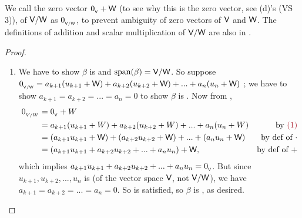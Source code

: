 \begin{note}
We call the zero vector \(0_{_{\textsf{V}}} + \textsf{W}\) (to see why this is the zero vector, see (d)'s (VS 3)), of \(\textsf{V}/\textsf{W}\) as \(0_{_{\textsf{V}/\textsf{W}}}\), to prevent ambiguity of zero vectors of \(\textsf{V}\) and \(\textsf{W}\).
The definitions of addition and scalar multiplication of \(\textsf{V}/\textsf{W}\) are also in .
\end{note}

\begin{proof} \ 

\begin{enumerate}
\item
We have to show \(\beta\) is \LID{} and \(\operatorname{span}(\beta) = \textsf{V}/\textsf{W}\).
So suppose \(0_{_{\textsf{V}/\textsf{W}}} = a_{k + 1} (u_{k + 1} + \textsf{W}) + a_{k + 2} (u_{k + 2} + \textsf{W}) + ... + a_n (u_n + \textsf{W})\) ;
we have to show \(a_{k + 1} = a_{k + 2} = ... = a_n = 0\) to show \(\beta\) is \LID{} .
Now from ,
\begin{align*}
    0_{_{V/W}} & = \OV + W \\
               & = a_{k + 1} (u_{k + 1} + W) + a_{k + 2} (u_{k + 2} + W) + ... + a_n (u_n + W) & \text{by \MAROON{(1)}} \\
               & = (a_{k + 1} u_{k + 1} + \W) + (a_{k + 2} u_{k + 2} + \W) + ... + (a_n u_n + \W) & \text{by def of \(\cdot\)} \\
               & = (a_{k + 1} u_{k + 1} + a_{k + 2} u_{k + 2} + ... + a_n u_n) + \W, & \text{by def of \(+\)}
\end{align*}
which implies \(a_{k + 1} u_{k + 1} + a_{k + 2} u_{k + 2} + ... + a_n u_n = 0_{_{\textsf{V}}}\).
But since \(u_{k + 1}, u_{k + 2}, ..., u_n\) is \LID{} (of the vector space \(\textsf{V}\), not \(\textsf{V}/\textsf{W}\)), we have \(a_{k + 1} = a_{k + 2} = ... = a_n = 0\).
So  is satisfied, so \(\beta\) is \LID{}, as desired.


\end{enumerate}
\end{proof}

